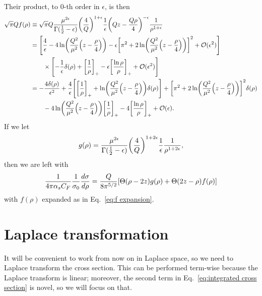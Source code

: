 \documentclass[11pt,twoside,reqno]{amsart}
\theoremstyle{plain}
\theoremstyle{remark}
\theoremstyle{definition}
\theoremstyle{remark}
\theoremstyle{definition}
\theoremstyle{definition}
\newcommand{\cO}{\mathcal{O}}
\begin{document}
	Their product, to $0$-th order in $\epsilon$, is then
	\begin{align}
		\sqrt{\pi} Q f(\rho) &\equiv \sqrt{\pi}Q \frac{\mu^{2\epsilon}}{\Gamma(\frac{1}{2} - \epsilon)} \qty(\frac{4}{Q})^{1+\epsilon}\frac{1}{\epsilon} \qty(Qz - \frac{Q\rho}{4})^{-\epsilon} \frac{1}{\rho^{1+\epsilon}} \\
		&= \qty[\frac{4}{\epsilon} - 4\ln(\frac{Q^2}{\mu^2}\qty(z - \frac{\rho}{4})) - \epsilon\qty[\pi^2 + 2\ln(\frac{Q^2}{\mu^2}\qty(z - \frac{\rho}{4}))]^2 + \cO(\epsilon^2)] \\
			&\qquad \times \qty[-\frac{1}{\epsilon}\delta(\rho) + \qty[\frac{1}{\rho}]_+ - \epsilon \qty[\frac{\ln \rho}{\rho}]_+ + \cO(\epsilon^2)] \nonumber \\
		&= -\frac{4\delta(\rho)}{\epsilon^2} + \frac{4}{\epsilon}\qty[\qty[\frac{1}{\rho}]_+ + \ln(\frac{Q^2}{\mu^2} \qty(z - \frac{\rho}{4})) \delta(\rho)] + \qty[\pi^2 + 2\ln(\frac{Q^2}{\mu^2} \qty(z - \frac{\rho}{4}))]^2 \delta(\rho) \label{eq:f expansion}\\
			&\qquad - 4 \ln(\frac{Q^2}{\mu^2}\qty(z - \frac{\rho}{4})) \qty[\frac{1}{\rho}]_+ - 4\qty[\frac{\ln\rho}{\rho}]_+ + \cO(\epsilon). \nonumber
	\end{align}
	If we let
	\begin{equation}
		g(\rho) = \frac{\mu^{2\epsilon}}{\Gamma(\frac{1}{2} - \epsilon)} \qty(\frac{4}{Q})^{1+2\epsilon}\frac{1}{\epsilon} \frac{1}{\rho^{1+2\epsilon}},
	\end{equation}
	then we are left with
	\begin{equation}
		\frac{1}{4\pi \alpha_s C_F}\frac{1}{\sigma_0} \frac{d\sigma}{d\rho} = \frac{Q}{8\pi^{5/2}} \qty[\Theta(\rho - 2z)g(\rho) + \Theta(2z-\rho)f(\rho)]
	\end{equation}
	with $f(\rho)$ expanded as in Eq.\ \ref{eq:f expansion}.

\section{Laplace transformation}
	
	It will be convenient to work from now on in Laplace space, so we need to Laplace transform the cross section. This can be performed term-wise because the Laplace transform is linear; moreover, the second term in Eq.\ \ref{eq:integrated cross section} is novel, so we will focus on that.
\end{document}
